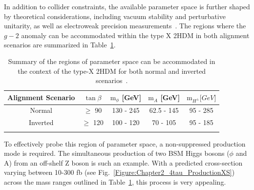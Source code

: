In addition to collider constraints, the available parameter space is further shaped by theoretical considerations, including vacuum stability and perturbative unitarity, as well as electroweak precision measurements~\cite{TypeX_2HDM}. The regions where the $g-2$ anomaly can be accommodated within the type X 2HDM in both alignment scenarios are summarized in Table~\ref{Table:Chapter2_TypeX-ParameterSpace}.

\begin{table}[h]
\centering
\renewcommand{\arraystretch}{1.5} %
\setlength{\tabcolsep}{12pt} %
\begin{tabular}{|c|c|c|c|c|}
\hline
Alignment Scenario & $\tan{\beta}$ & $\text{m}_\phi$ {[}GeV{]} & $\text{m}_A$ {[}GeV{]} & $\text{m}_{H^\pm} {[}GeV{]}$ \\ \hline \hline
Normal             & $\geq$ 90     & 130 - 245                 & 62.5 - 145             & 95 - 285                     \\ \arrayrulecolor{lightgray} \hline
Inverted           & $\geq$ 120    & 100 - 120                 & 70 - 105               & 95 - 185 \\ \arrayrulecolor{black} \hline
\end{tabular}
\caption{Summary of the regions of parameter space can be accommodated in the context of the type-X 2HDM for both normal and inverted scenarios~\cite{TypeX_2HDM}.}
\label{Table:Chapter2_TypeX-ParameterSpace}
\end{table}

To effectively probe this region of parameter space, a non-suppressed production mode is required. The simultaneous production of two BSM Higgs bosons ($\phi$ and A) from an off-shelf Z boson is such an example. With a predicted cross-section varying between 10-300 fb (see Fig.~\ref{Figure:Chapter2_4tau_ProductionXS}) across the mass ranges outlined in Table~\ref{Table:Chapter2_TypeX-ParameterSpace}, this process is very appealing. 

